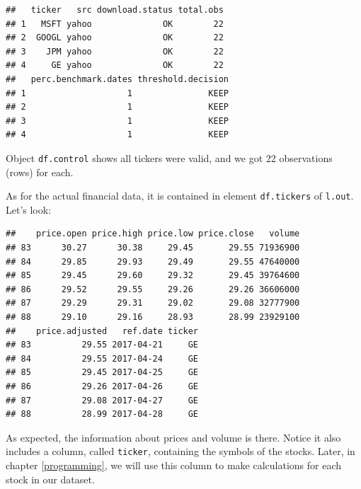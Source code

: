\documentclass[11pt,]{book}
\newenvironment{Shaded}{\begin{snugshade}}{\end{snugshade}}
\newcommand{\KeywordTok}[1]{\textcolor[rgb]{0.27,0.27,0.27}{\textbf{#1}}}
\newcommand{\CommentTok}[1]{\textcolor[rgb]{0.56,0.35,0.01}{\textit{#1}}}
\newcommand{\OperatorTok}[1]{\textcolor[rgb]{0.81,0.36,0.00}{\textbf{#1}}}
\newcommand{\NormalTok}[1]{#1}
\begin{document}
\begin{Shaded}
\end{Shaded}

\begin{verbatim}
##   ticker   src download.status total.obs
## 1   MSFT yahoo              OK        22
## 2  GOOGL yahoo              OK        22
## 3    JPM yahoo              OK        22
## 4     GE yahoo              OK        22
##   perc.benchmark.dates threshold.decision
## 1                    1               KEEP
## 2                    1               KEEP
## 3                    1               KEEP
## 4                    1               KEEP
\end{verbatim}

Object \texttt{df.control} shows all tickers were valid, and we got 22
observations (rows) for each.

As for the actual financial data, it is contained in element
\texttt{df.tickers} of \texttt{l.out}. Let's look:

\begin{Shaded}
\end{Shaded}

\begin{verbatim}
##    price.open price.high price.low price.close   volume
## 83      30.27      30.38     29.45       29.55 71936900
## 84      29.85      29.93     29.49       29.55 47640000
## 85      29.45      29.60     29.32       29.45 39764600
## 86      29.52      29.55     29.26       29.26 36606000
## 87      29.29      29.31     29.02       29.08 32777900
## 88      29.10      29.16     28.93       28.99 23929100
##    price.adjusted   ref.date ticker
## 83          29.55 2017-04-21     GE
## 84          29.55 2017-04-24     GE
## 85          29.45 2017-04-25     GE
## 86          29.26 2017-04-26     GE
## 87          29.08 2017-04-27     GE
## 88          28.99 2017-04-28     GE
\end{verbatim}

As expected, the information about prices and volume is there. Notice it
also includes a column, called \texttt{ticker}, containing the symbols
of the stocks. Later, in chapter \ref{programming}, we will use this
column to make calculations for each stock in our dataset.
\end{document}
